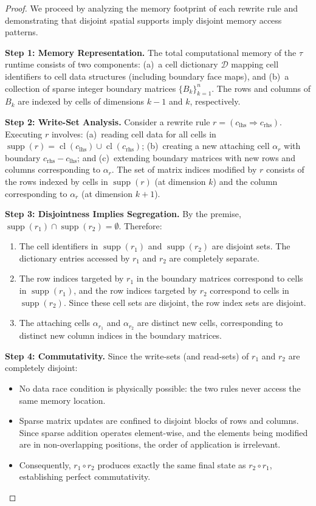 \documentclass[manuscript, nonacm, review=false]{acmart}
\theoremstyle{definition}
\theoremstyle{plain}
\newcommand{\supp}{\operatorname{supp}}
\newcommand{\cl}{\operatorname{cl}}
\newcommand{\toposLang}{\ensuremath{\tau}\text{-Lang}}
\begin{document}
\begin{proof}
We proceed by analyzing the memory footprint of each rewrite rule and demonstrating that disjoint spatial supports imply disjoint memory access patterns.

\textbf{Step 1: Memory Representation.}
The total computational memory of the \toposLang{} runtime consists of two components: (a)~a cell dictionary $\mathcal{D}$ mapping cell identifiers to cell data structures (including boundary face maps), and (b)~a collection of sparse integer boundary matrices $\{B_k\}_{k=1}^{n}$. The rows and columns of $B_k$ are indexed by cells of dimensions $k-1$ and $k$, respectively.

\textbf{Step 2: Write-Set Analysis.}
Consider a rewrite rule $r = (c_{\text{lhs}} \Rightarrow c_{\text{rhs}})$. Executing $r$ involves: (a)~reading cell data for all cells in $\supp(r) = \cl(c_{\text{lhs}}) \cup \cl(c_{\text{rhs}})$; (b)~creating a new attaching cell $\alpha_r$ with boundary $c_{\text{rhs}} - c_{\text{lhs}}$; and (c)~extending boundary matrices with new rows and columns corresponding to $\alpha_r$. The set of matrix indices modified by $r$ consists of the rows indexed by cells in $\supp(r)$ (at dimension $k$) and the column corresponding to $\alpha_r$ (at dimension $k+1$).

\textbf{Step 3: Disjointness Implies Segregation.}
By the premise, $\supp(r_1) \cap \supp(r_2) = \emptyset$. Therefore:
\begin{enumerate}[label=(\alph*)]
    \item The cell identifiers in $\supp(r_1)$ and $\supp(r_2)$ are disjoint sets. The dictionary entries accessed by $r_1$ and $r_2$ are completely separate.
    \item The row indices targeted by $r_1$ in the boundary matrices correspond to cells in $\supp(r_1)$, and the row indices targeted by $r_2$ correspond to cells in $\supp(r_2)$. Since these cell sets are disjoint, the row index sets are disjoint.
    \item The attaching cells $\alpha_{r_1}$ and $\alpha_{r_2}$ are distinct new cells, corresponding to distinct new column indices in the boundary matrices.
\end{enumerate}

\textbf{Step 4: Commutativity.}
Since the write-sets (and read-sets) of $r_1$ and $r_2$ are completely disjoint:
\begin{itemize}
    \item No data race condition is physically possible: the two rules never access the same memory location.
    \item Sparse matrix updates are confined to disjoint blocks of rows and columns. Since sparse addition operates element-wise, and the elements being modified are in non-overlapping positions, the order of application is irrelevant.
    \item Consequently, $r_1 \circ r_2$ produces exactly the same final state as $r_2 \circ r_1$, establishing perfect commutativity.
\end{itemize}


\end{proof}
\end{document}
